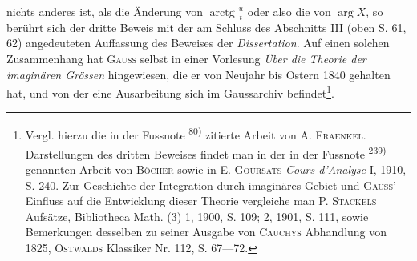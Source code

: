 nichts anderes ist, als die Änderung von \(\operatorname{arctg}\frac ut\) oder also die von \(\arg X\), so
berührt sich der dritte Beweis mit der am Schluss des Abschnitts III (oben
S. 61, 62) angedeuteten Auffassung des Beweises der \textit{Dissertation}. Auf einen
solchen Zusammenhang hat \textsc{Gauss} selbst in einer Vorlesung \textit{Über die Theorie
der imaginären Grössen} hingewiesen, die er von Neujahr bis Ostern 1840 gehalten
hat, und von der eine Ausarbeitung sich im Gaussarchiv befindet\footnote{Vergl. hierzu die in der Fussnote \textsuperscript{80)} zitierte Arbeit von A. \textsc{Fraenkel}. Darstellungen des dritten Beweises findet man in der in der Fussnote \textsuperscript{239)} genannten Arbeit von \textsc{Bôcher} sowie in E. \textsc{Goursats} \textit{Cours d'Analyse} I, 1910, S. 240. Zur Geschichte der Integration durch imaginäres Gebiet und \textsc{Gauss'} Einfluss auf die Entwicklung dieser Theorie vergleiche man P. \textsc{Stäckels} Aufsätze, Bibliotheca Math. (3) 1, 1900, S. 109; 2, 1901, S. 111, sowie Bemerkungen desselben zu seiner Ausgabe von \textsc{Cauchys} Abhandlung von 1825, \textsc{Ostwalds} Klassiker Nr. 112, S. 67—72.}.\par
